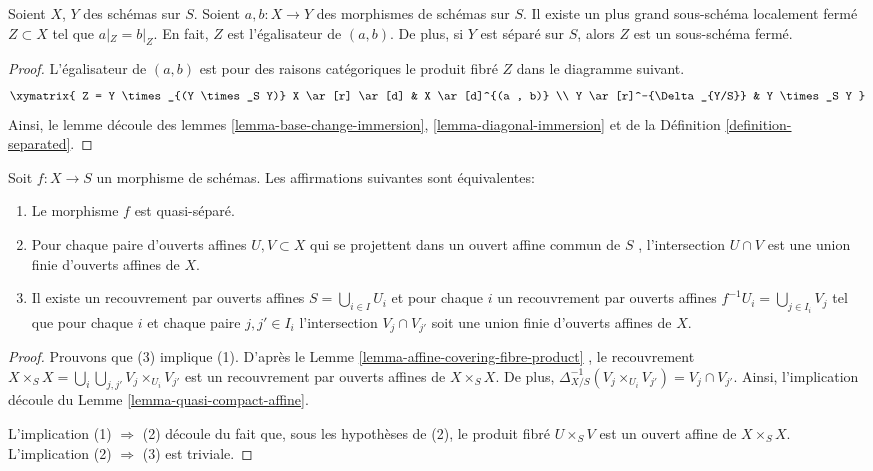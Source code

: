 \begin{lemma}
\label{lemma-where-are-they-equal}
Soient  $X$,  $Y$  des schémas sur  $S$. Soient
 $a, b : X \to Y$  des morphismes de schémas sur  $S$. Il existe un plus grand
sous-schéma localement fermé  $Z \subset X$  tel que  $a|_Z = b|_Z$. En fait,
 $Z$  est l'égalisateur de  $(a, b)$. De plus, si  $Y$  est séparé
sur  $S$, alors  $Z$  est un sous-schéma fermé.
\end{lemma}

\begin{proof}
L'égalisateur de  $(a, b)$  est pour des raisons catégoriques le produit fibré
 $Z$  dans le diagramme suivant.
$$
\xymatrix{
Z = Y \times_{(Y \times_S Y)} X \ar[r] \ar[d] &
 X \ar[d]^{(a , b)} \\
Y \ar[r]^-{\Delta_{Y/S}} & Y \times_S Y
}
$$
Ainsi, le lemme découle des lemmes  \ref{lemma-base-change-immersion},  \ref{lemma-diagonal-immersion}  et de la Définition
 \ref{definition-separated}.
\end{proof}

\begin{lemma}
\label{lemma-characterize-quasi-separated}
Soit  $f : X \to S$  un morphisme de schémas. Les affirmations suivantes sont
équivalentes:
\begin{enumerate}
\item Le morphisme  $f$  est quasi-séparé.
\item Pour chaque paire d'ouverts affines  $U, V \subset X$  qui se projettent dans un ouvert
affine commun de  $S$ , l'intersection  $U \cap V$  est une union finie
d'ouverts affines de  $X$.
\item Il existe un recouvrement par ouverts affines  $S = \bigcup_{i \in I} U_i$  et pour chaque
 $i$  un recouvrement par ouverts affines  $f^{-1}U_i = \bigcup_{j \in I_i} V_j$  tel que pour chaque
 $i$  et chaque paire  $j, j' \in I_i$  l'intersection  $V_j \cap V_{j'}$  soit une
union finie d'ouverts affines de  $X$.
\end{enumerate}
\end{lemma}

\begin{proof}
Prouvons que (3) implique (1). D'après le Lemme  \ref{lemma-affine-covering-fibre-product} , le recouvrement
 $X \times_S X = \bigcup_i \bigcup_{j, j'} V_j \times_{U_i} V_{j'}$  est un recouvrement par ouverts affines de  $X \times_S X$. De plus,
 $\Delta_{X/S}^{-1}(V_j \times_{U_i} V_{j'}) = V_j \cap V_{j'}$. Ainsi, l'implication découle du Lemme  \ref{lemma-quasi-compact-affine}.

\medskip\noindent
L'implication (1)  $\Rightarrow$  (2) découle du fait que, sous les hypothèses de
(2), le produit fibré  $U \times_S V$  est un ouvert affine de  $X \times_S X$.
L'implication (2)  $\Rightarrow$  (3) est triviale.
\end{proof}

